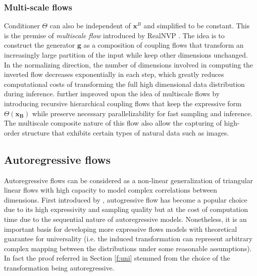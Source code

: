 \subsubsection{Multi-scale flows}

Conditioner $\Theta$ can also be independent of $\textbf{x}^B$ and simplified to
be constant. This is the premise of \textit{multiscale flow} introduced by
RealNVP \cite{dinhDensityEstimationUsing2017}. The idea is to construct the generator
$\textbf{g}$ as a composition of coupling flows that transform an
increasingly large partition of the input while keep other dimensions
unchanged. In the normalizing direction, the number of dimensions involved in
computing the inverted flow decreases exponentially in each
step, which greatly reduces computational costs of transforming the full
high dimensional data distribution during inference.
\cite{kruseHINTHierarchicalInvertible2021} further improved upon the idea of
multiscale flows by introducing recursive hierarchical coupling flows that
keep the expressive form $\Theta(\mathbf{x_B})$ while preserve necessary parallelizability for fast
sampling and inference. The multiscale composite nature of this
flow also allow the capturing of high-order structure that exhibits certain
types of natural data such as images.

\subsection{Autoregressive flows}

Autoregressive flows can be considered as a non-linear generalization of
triangular linear flows with high capacity to model complex correlations between dimensions. First introduced by
\cite{kingmaImprovedVariationalInference2016}, autogressive flow has become a popular choice
due to its high expressivity and sampling quality but at the cost of computation
time due to the sequential nature of autoregressive models. Nonetheless,
it is an important basis for developing more expressive
flows models with theoretical guarantee for universality (i.e. the induced
transformation can represent arbitrary complex mapping between
the distributions under some reasonable assumptions). In fact the
proof referred in Section \ref{f:uni} stemmed from the choice of the
transformation being autoregressive.


